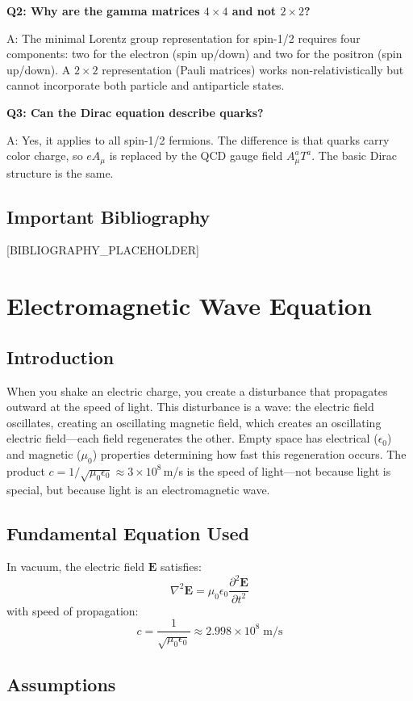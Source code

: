 \documentclass[11pt,openright]{book}
\begin{document}
\textbf{Q2: Why are the gamma matrices $4\times 4$ and not $2\times 2$?}

A: The minimal Lorentz group representation for spin-1/2 requires four components: two for the electron (spin up/down) and two for the positron (spin up/down). A $2\times 2$ representation (Pauli matrices) works non-relativistically but cannot incorporate both particle and antiparticle states.

\textbf{Q3: Can the Dirac equation describe quarks?}

A: Yes, it applies to all spin-1/2 fermions. The difference is that quarks carry color charge, so $eA_\mu$ is replaced by the QCD gauge field $A_\mu^a T^a$. The basic Dirac structure is the same.
\section*{Important Bibliography}

[BIBLIOGRAPHY_PLACEHOLDER]


\chapter{Electromagnetic Wave Equation}

\section*{Introduction}

When you shake an electric charge, you create a disturbance that propagates outward at the speed of light. This disturbance is a wave: the electric field oscillates, creating an oscillating magnetic field, which creates an oscillating electric field---each field regenerates the other. Empty space has electrical ($\epsilon_0$) and magnetic ($\mu_0$) properties determining how fast this regeneration occurs. The product $c = 1/\sqrt{\mu_0 \epsilon_0} \approx 3 \times 10^8$\,m/s is the speed of light---not because light is special, but because light is an electromagnetic wave.
\section*{Fundamental Equation Used}

In vacuum, the electric field $\mathbf{E}$ satisfies:
\[
\nabla^2 \mathbf{E} = \mu_0 \epsilon_0 \frac{\partial^2 \mathbf{E}}{\partial t^2}
\]
with speed of propagation:
\[
c = \frac{1}{\sqrt{\mu_0 \epsilon_0}} \approx 2.998 \times 10^8 \;\text{m/s}
\]
\section*{Assumptions}
\end{document}
